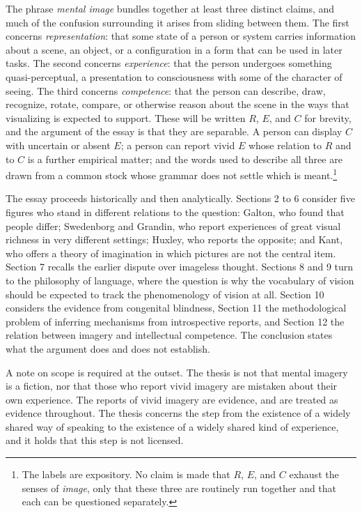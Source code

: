 \documentclass[11pt]{article}
\theoremstyle{remark}
\begin{document}
The phrase \emph{mental image} bundles together at least three distinct claims, and much of the confusion surrounding it arises from sliding between them. The first concerns \emph{representation}: that some state of a person or system carries information about a scene, an object, or a configuration in a form that can be used in later tasks. The second concerns \emph{experience}: that the person undergoes something quasi-perceptual, a presentation to consciousness with some of the character of seeing. The third concerns \emph{competence}: that the person can describe, draw, recognize, rotate, compare, or otherwise reason about the scene in the ways that visualizing is expected to support. These will be written $R$, $E$, and $C$ for brevity, and the argument of the essay is that they are separable. A person can display $C$ with uncertain or absent $E$; a person can report vivid $E$ whose relation to $R$ and to $C$ is a further empirical matter; and the words used to describe all three are drawn from a common stock whose grammar does not settle which is meant.\footnote{The labels are expository. No claim is made that $R$, $E$, and $C$ exhaust the senses of \emph{image}, only that these three are routinely run together and that each can be questioned separately.}

The essay proceeds historically and then analytically. Sections 2 to 6 consider five figures who stand in different relations to the question: Galton, who found that people differ; Swedenborg and Grandin, who report experiences of great visual richness in very different settings; Huxley, who reports the opposite; and Kant, who offers a theory of imagination in which pictures are not the central item. Section 7 recalls the earlier dispute over imageless thought. Sections 8 and 9 turn to the philosophy of language, where the question is why the vocabulary of vision should be expected to track the phenomenology of vision at all. Section 10 considers the evidence from congenital blindness, Section 11 the methodological problem of inferring mechanisms from introspective reports, and Section 12 the relation between imagery and intellectual competence. The conclusion states what the argument does and does not establish.

A note on scope is required at the outset. The thesis is not that mental imagery is a fiction, nor that those who report vivid imagery are mistaken about their own experience. The reports of vivid imagery are evidence, and are treated as evidence throughout. The thesis concerns the step from the existence of a widely shared way of speaking to the existence of a widely shared kind of experience, and it holds that this step is not licensed.
\end{document}
